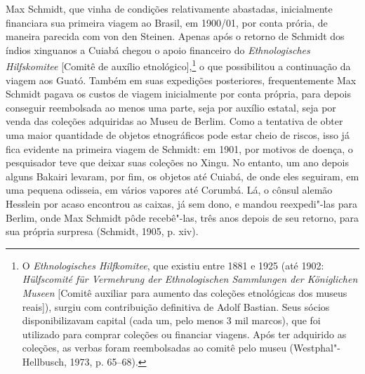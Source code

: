 Max Schmidt, que vinha de condições relativamente abastadas,
inicialmente financiara sua primeira viagem ao Brasil, em 1900/01, por
conta prória, de maneira parecida com von den Steinen. Apenas após o
retorno de Schmidt dos índios xinguanos a Cuiabá chegou o apoio
financeiro do \emph{Ethnologisches Hilfskomitee} {[}Comitê de auxílio
etnológico{]},\footnote{O \emph{Ethnologisches Hilfkomitee}, que existiu
  entre 1881 e 1925 (até 1902: \emph{Hülfscomité für Vermehrung der
  Ethnologischen Sammlungen der Königlichen Museen} {[}Comitê auxiliar
  para aumento das coleções etnológicas dos museus reais{]}), surgiu
  com contribuição definitiva de Adolf Bastian. Seus sócios
  disponibilizavam capital (cada um, pelo menos 3 mil marcos), que foi
  utilizado para comprar coleções ou financiar viagens. Após ter
  adquirido as coleções, as verbas foram reembolsadas ao comitê pelo
  museu (Westphal"-Hellbusch, 1973, p. 65--68).} o que possibilitou a
continuação da viagem aos Guató. Também em suas expedições posteriores,
frequentemente Max Schmidt pagava os custos de viagem inicialmente por
conta própria, para depois conseguir reembolsada ao menos uma parte,
seja por auxílio estatal, seja por venda das coleções adquiridas ao
Museu de Berlim. Como a tentativa de obter uma maior quantidade de
objetos etnográficos pode estar cheio de riscos, isso já fica evidente
na primeira viagem de Schmidt: em 1901, por motivos de doença, o
pesquisador teve que deixar suas coleções no Xingu. No entanto, um ano
depois alguns Bakairi levaram, por fim, os objetos até Cuiabá, de onde
eles seguiram, em uma pequena odisseia, em vários vapores até Corumbá.
Lá, o cônsul alemão Hesslein por acaso encontrou as caixas, já sem dono,
e mandou reexpedi"-las para Berlim, onde Max Schmidt pôde recebê"-las,
três anos depois de seu retorno, para sua própria surpresa (Schmidt,
1905, p. xiv).

